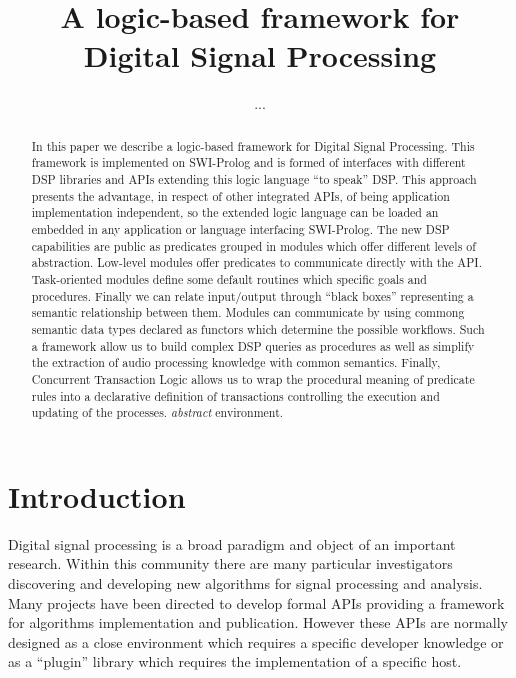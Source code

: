 \documentclass{llncs}
\begin{document}
\title{A logic-based framework for Digital Signal Processing}

\author{...}

\maketitle


\begin{abstract}
In this paper we describe a logic-based framework for Digital Signal Processing. This framework is implemented on SWI-Prolog and is formed of interfaces with different DSP libraries and APIs extending this logic language ``to speak'' DSP. This approach presents the advantage, in respect of other integrated APIs, of being application implementation independent, so the extended logic language can be loaded an embedded in any application or language interfacing SWI-Prolog. The new DSP capabilities are public as predicates grouped in modules which offer different levels of abstraction. Low-level modules offer predicates to communicate directly with the API. Task-oriented modules define some default routines which specific goals and procedures. Finally we can relate input/output through ``black boxes'' representing a semantic relationship between them. Modules can communicate by using commong semantic data types declared as functors which determine the possible workflows. Such a framework allow us to build complex DSP queries as procedures as well as simplify the extraction of audio processing knowledge with common semantics. Finally, Concurrent Transaction Logic allows us to wrap the procedural meaning of predicate rules into a declarative definition of transactions controlling the execution and updating of the processes.
\emph{abstract} environment.

\end{abstract}


\section{Introduction}

Digital signal processing is a broad paradigm and object of an important research. Within this community there are many particular investigators discovering and developing new algorithms for signal processing and analysis. Many projects have been directed to develop formal APIs providing a framework for algorithms implementation and publication. However these APIs are normally designed as a close environment which requires a specific developer knowledge or as a ``plugin'' library which requires the implementation of a specific host.
\end{document}
